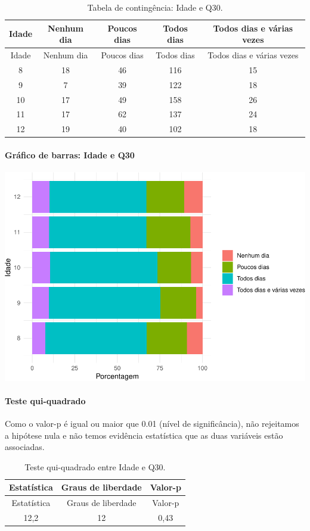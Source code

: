 \documentclass[]{article}
\let\oldparagraph\paragraph
\renewcommand{\paragraph}[1]{\oldparagraph{#1}\mbox{}}
\begin{document}
\begin{longtable}[]{@{}ccccc@{}}
\caption{\label{tab:unnamed-chunk-976}Tabela de contingência: Idade e Q30.}\tabularnewline
\toprule
Idade & Nenhum dia & Poucos dias & Todos dias & Todos dias e várias vezes\tabularnewline
\midrule
\endfirsthead
\toprule
Idade & Nenhum dia & Poucos dias & Todos dias & Todos dias e várias vezes\tabularnewline
\midrule
\endhead
8 & 18 & 46 & 116 & 15\tabularnewline
9 & 7 & 39 & 122 & 18\tabularnewline
10 & 17 & 49 & 158 & 26\tabularnewline
11 & 17 & 62 & 137 & 24\tabularnewline
12 & 19 & 40 & 102 & 18\tabularnewline
\bottomrule
\end{longtable}

\hypertarget{gruxe1fico-de-barras-idade-e-q30}{%
\paragraph{Gráfico de barras: Idade e Q30}\label{gruxe1fico-de-barras-idade-e-q30}}

\begin{center}\includegraphics[width=0.75\linewidth]{relatorio_covid19_files/figure-latex/unnamed-chunk-977-1} \end{center}

\hypertarget{teste-qui-quadrado-84}{%
\paragraph{Teste qui-quadrado}\label{teste-qui-quadrado-84}}

Como o valor-p é igual ou maior que 0.01 (nível de significância), não rejeitamos a hipótese nula e não temos evidência estatística que as duas variáveis estão associadas.

\begin{longtable}[]{@{}ccc@{}}
\caption{\label{tab:unnamed-chunk-979}Teste qui-quadrado entre Idade e Q30.}\tabularnewline
\toprule
Estatística & Graus de liberdade & Valor-p\tabularnewline
\midrule
\endfirsthead
\toprule
Estatística & Graus de liberdade & Valor-p\tabularnewline
\midrule
\endhead
12,2 & 12 & 0,43\tabularnewline
\bottomrule
\end{longtable}
\end{document}
